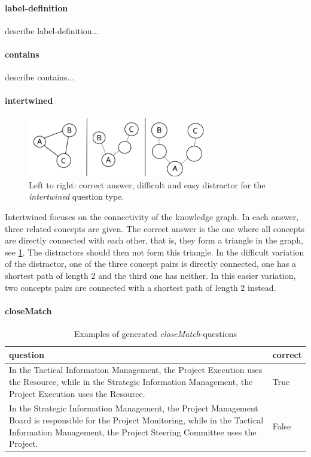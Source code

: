 \documentclass{IOS-Book-Article}     %
\begin{document}
\paragraph{label-definition}
describe label-definition...

\paragraph{contains}
describe contains...

\paragraph{intertwined}

\begin{figure}
\includegraphics[width=0.7\textwidth]{img/intertwined_cml.png} 
\caption{Left to right: correct answer, difficult and easy distractor for the \emph{intertwined} question type.}
\label{fig:intertwined}
\end{figure}

Intertwined focuses on the connectivity of the knowledge graph.
In each answer, three related concepts are given.
The correct answer is the one where all concepts are directly connected with each other, that is, they form a triangle in the graph, see \cref{fig:intertwined}.
The distractors should then not form this triangle.
In the difficult variation of the distractor, one of the three concept pairs is directly connected, one has a shortest path of length 2 and the third one has neither.
In this easier variation, two concepts pairs are connected with a shortest path of length 2 instead.

\paragraph{closeMatch}
\begin{table}[h]
\begin{tabulary}{\textwidth}{Ll}
\toprule
question	& correct\\
\midrule
In the Tactical Information Management, the Project Execution uses the Resource, while in the Strategic Information Management, the Project Execution uses the Resource.											&True \\
In the Strategic Information Management, the Project Management Board is responsible for  the Project Monitoring, while in the Tactical Information Management, the Project Steering Committee uses the Project.	&False \\
\bottomrule
\end{tabulary}
\caption{Examples of generated \emph{closeMatch}-questions}
\label{tab:closematch}
\end{table}
\end{document}
